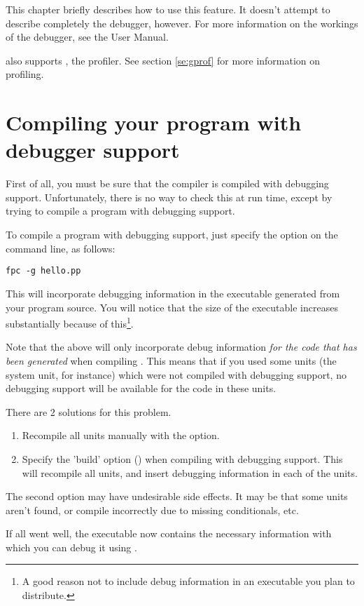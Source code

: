 This chapter briefly describes how to use this feature. It doesn't attempt
to describe completely the \gnu debugger, however.
For more information on the workings of the \gnu debugger, see the 
User Manual.

\fpc also supports , the \gnu profiler. See section \ref{se:gprof}
for more information on profiling.

\section{Compiling your program with debugger support}
First of all, you must be sure that the compiler is compiled with debugging
support. Unfortunately, there is no way to check this at run time, except by
trying to compile a program with debugging support.

To compile a program with debugging support, just specify the 
option on the command line, as follows:
\begin{verbatim}
fpc -g hello.pp
\end{verbatim}
This will incorporate debugging information in the executable generated 
from your program source. You will notice that the size of the executable 
increases substantially because of this\footnote{A good reason not to include debug
information in an executable you plan to distribute.}.

Note that the above will only incorporate debug information {\em for the code
that has been generated} when compiling . This means that if
you used some units (the system unit, for instance) which were not compiled
with debugging support, no debugging support will be available for the code
in these units.

There are 2 solutions for this problem.
\begin{enumerate}
\item Recompile all units manually with the  option.
\item Specify the 'build' option () when compiling with debugging
support. This will recompile all units, and insert debugging information in
each of the units.
\end{enumerate}
The second option may have undesirable side effects. It may be that some
units aren't found, or compile incorrectly due to missing conditionals,
etc.

If all went well, the executable now contains the necessary information with
which you can debug it using \gnu {}.


